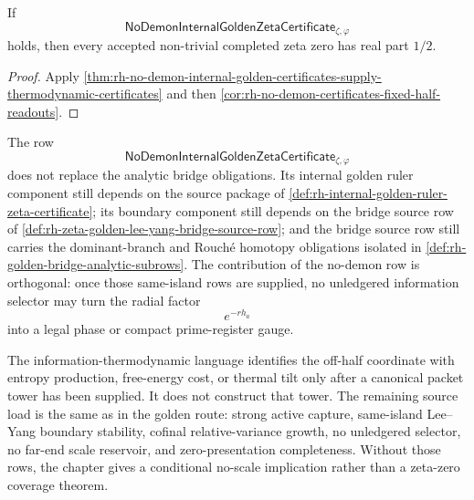 \begin{corollary}
\label{cor:rh-no-demon-internal-golden-certificates-fixed-half-readout}
If
$$
\mathsf{NoDemonInternalGoldenZetaCertificate}_{\zeta,\varphi}
$$
holds, then every accepted non-trivial completed zeta zero has real part
$1/2$.
\end{corollary}

\begin{proof}
Apply
\autoref{thm:rh-no-demon-internal-golden-certificates-supply-thermodynamic-certificates}
and then
\autoref{cor:rh-no-demon-certificates-fixed-half-readouts}.
\end{proof}

\begin{principle}
\label{prin:rh-no-demon-internal-golden-source-load}
The row
$$
\mathsf{NoDemonInternalGoldenZetaCertificate}_{\zeta,\varphi}
$$
does not replace the analytic bridge obligations.  Its internal golden
ruler component still depends on the source package of
\autoref{def:rh-internal-golden-ruler-zeta-certificate}; its boundary
component still depends on the bridge source row of
\autoref{def:rh-zeta-golden-lee-yang-bridge-source-row}; and the bridge
source row still carries the dominant-branch and Rouch\'e homotopy
obligations isolated in
\autoref{def:rh-golden-bridge-analytic-subrows}.  The contribution of
the no-demon row is orthogonal: once those same-island rows are supplied,
no unledgered information selector may turn the radial factor
$$
e^{-r h_a}
$$
into a legal phase or compact prime-register gauge.
\end{principle}

\begin{principle}
\label{prin:rh-thermodynamic-wording-proof-boundary}
The information-thermodynamic language identifies the off-half coordinate
with entropy production, free-energy cost, or thermal tilt only after a
canonical packet tower has been supplied.  It does not construct that
tower.  The remaining source load is the same as in the golden route:
strong active capture, same-island Lee--Yang boundary stability,
cofinal relative-variance growth, no unledgered selector, no far-end
scale reservoir, and zero-presentation completeness.  Without those rows,
the chapter gives a conditional no-scale implication rather than a
zeta-zero coverage theorem.
\end{principle}
